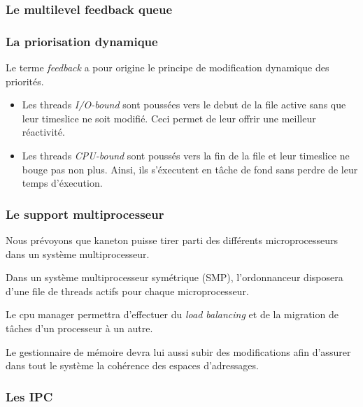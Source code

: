 
\begin{frame}
  \frametitle{Le multilevel feedback queue}

  \begin{center}
  \end{center}
\end{frame}


\begin{frame}
  \frametitle{La priorisation dynamique}

  Le terme \emph{feedback} a pour origine le principe de
  modification dynamique des priorit\'{e}s.

  \begin{itemize}
  \item
    Les threads \emph{I/O-bound} sont pouss\'{e}es vers le debut de la
    file active sans que leur timeslice ne soit modifi\'{e}. Ceci permet
    de leur offrir une meilleur r\'{e}activit\'{e}.
  \item
    Les threads \emph{CPU-bound} sont pouss\'{e}s vers la fin de la file
    et leur timeslice ne bouge pas non plus. Ainsi, ils s'\'{e}xecutent en
    tâche de fond sans perdre de leur temps d'\'{e}xecution.
  \end{itemize}

\end{frame}


\begin{frame}
  \frametitle{Le support multiprocesseur}

  Nous pr\'{e}voyons que kaneton puisse tirer parti des diff\'{e}rents
  microprocesseurs dans un syst\`{e}me multiprocesseur.

  \-

  Dans un syst\`{e}me multiprocesseur sym\'{e}trique (SMP),
  l'ordonnanceur disposera d'une file de threads actifs pour chaque
  microprocesseur.

  Le cpu manager permettra d'effectuer du \emph{load balancing} et de
  la migration de t\^{a}ches d'un processeur \`{a} un autre.

  \-

  Le gestionnaire de m\'{e}moire devra lui aussi subir des
  modifications afin d'assurer dans tout le syst\`{e}me la
  coh\'{e}rence des espaces d'adressages.

\end{frame}

\begin{frame}
  \frametitle{Les IPC}

\end{frame}

